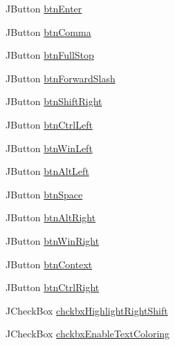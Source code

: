 \begin{DoxyCompactItemize}
\item 
J\+Button \hyperlink{classcom_1_1lclion_1_1midigui_1_1_dialog_on_screen_keyboard_ad7ed480b341e2e453e5857f54f2c0574}{btn\+Enter}
\item 
J\+Button \hyperlink{classcom_1_1lclion_1_1midigui_1_1_dialog_on_screen_keyboard_a78351a2292cd2bb5e405a7fb63bde8da}{btn\+Comma}
\item 
J\+Button \hyperlink{classcom_1_1lclion_1_1midigui_1_1_dialog_on_screen_keyboard_a4d5afe8ca2d30a690e44801559516daa}{btn\+Full\+Stop}
\item 
J\+Button \hyperlink{classcom_1_1lclion_1_1midigui_1_1_dialog_on_screen_keyboard_afc4fa10ed9a8c74b5ba3976b0f9513ef}{btn\+Forward\+Slash}
\item 
J\+Button \hyperlink{classcom_1_1lclion_1_1midigui_1_1_dialog_on_screen_keyboard_ae375d25d5103fe59e93bfe78bf894722}{btn\+Shift\+Right}
\item 
J\+Button \hyperlink{classcom_1_1lclion_1_1midigui_1_1_dialog_on_screen_keyboard_a79eb966f6f33a2cd4f9d46cd50a7d480}{btn\+Ctrl\+Left}
\item 
J\+Button \hyperlink{classcom_1_1lclion_1_1midigui_1_1_dialog_on_screen_keyboard_a1f5a6207904a8e20962cd520ea141d9b}{btn\+Win\+Left}
\item 
J\+Button \hyperlink{classcom_1_1lclion_1_1midigui_1_1_dialog_on_screen_keyboard_ae9d61f4815d45ac8888e4a7bf4344cc1}{btn\+Alt\+Left}
\item 
J\+Button \hyperlink{classcom_1_1lclion_1_1midigui_1_1_dialog_on_screen_keyboard_a5bffdd7e1b028002ae5b5464a4a289b9}{btn\+Space}
\item 
J\+Button \hyperlink{classcom_1_1lclion_1_1midigui_1_1_dialog_on_screen_keyboard_a3deb641d54b510ef4243b41c235d7d26}{btn\+Alt\+Right}
\item 
J\+Button \hyperlink{classcom_1_1lclion_1_1midigui_1_1_dialog_on_screen_keyboard_a7820654d38a637ac4cc0150639d8f99e}{btn\+Win\+Right}
\item 
J\+Button \hyperlink{classcom_1_1lclion_1_1midigui_1_1_dialog_on_screen_keyboard_a3aaad9ec5791601fbc2c85c6c87e73de}{btn\+Context}
\item 
J\+Button \hyperlink{classcom_1_1lclion_1_1midigui_1_1_dialog_on_screen_keyboard_aaa66232d265147ac72c937bf5569bacc}{btn\+Ctrl\+Right}
\item 
J\+Check\+Box \hyperlink{classcom_1_1lclion_1_1midigui_1_1_dialog_on_screen_keyboard_a439f5c81e352809a4343216fbaf9a5c8}{chckbx\+Highlight\+Right\+Shift}
\item 
J\+Check\+Box \hyperlink{classcom_1_1lclion_1_1midigui_1_1_dialog_on_screen_keyboard_ad4773803d6cd9e0515570c744f580f20}{chckbx\+Enable\+Text\+Coloring}

\end{DoxyCompactItemize}

